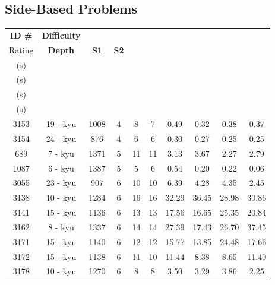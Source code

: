 \documentclass{l4proj}
\begin{document}
\begin{appendices}
\section{Side-Based Problems}
\begin{longtable}{|c|c|c|c|c|c|c|c|c|c|}
\hline
\textbf{ID \#} & \textbf{Difficulty} & \textbf{\begin{tabular}[c]{@{}c@{}}Difficulty \\ Rating\end{tabular}} & \textbf{Depth} & \textbf{S1} & \textbf{S2} & \textbf{\begin{tabular}[c]{@{}c@{}}T1 \\ (s)\end{tabular}} & \textbf{\begin{tabular}[c]{@{}c@{}}T2 \\ (s)\end{tabular}} & \textbf{\begin{tabular}[c]{@{}c@{}}T3 \\ (s)\end{tabular}} & \textbf{\begin{tabular}[c]{@{}c@{}}T4 \\ (s)\end{tabular}} \\ \hline
\endfirsthead
%
\endhead
%
3153 & 19 - kyu & 1008 & 4 & 8 & 7 & 0.49 & 0.32 & 0.38 & 0.37 \\ \hline
3154 & 24 - kyu & 876 & 4 & 6 & 6 & 0.30 & 0.27 & 0.25 & 0.25 \\ \hline
689 & 7 - kyu & 1371 & 5 & 11 & 11 & 3.13 & 3.67 & 2.27 & 2.79 \\ \hline
1087 & 6 - kyu & 1387 & 5 & 5 & 6 & 0.54 & 0.20 & 0.22 & 0.06 \\ \hline
3055 & 23 - kyu & 907 & 6 & 10 & 10 & 6.39 & 4.28 & 4.35 & 2.45 \\ \hline
3138 & 10 - kyu & 1284 & 6 & 16 & 16 & 32.29 & 36.45 & 28.98 & 30.86 \\ \hline
3141 & 15 - kyu & 1136 & 6 & 13 & 13 & 17.56 & 16.65 & 25.35 & 20.84 \\ \hline
3162 & 8 - kyu & 1337 & 6 & 14 & 14 & 27.39 & 17.43 & 26.70 & 37.45 \\ \hline
3171 & 15 - kyu & 1140 & 6 & 12 & 12 & 15.77 & 13.85 & 24.48 & 17.66 \\ \hline
3172 & 15 - kyu & 1138 & 6 & 11 & 10 & 11.44 & 8.38 & 8.65 & 11.40 \\ \hline
3178 & 10 - kyu & 1270 & 6 & 8 & 8 & 3.50 & 3.29 & 3.86 & 2.25 \\ \hline

\end{longtable}
\end{appendices}
\end{document}

